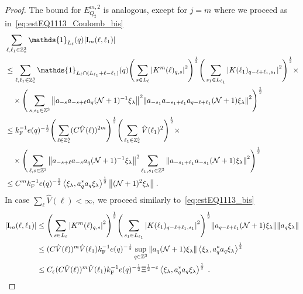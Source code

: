 \documentclass[12pt,a4paper]{article}
\numberwithin{equation}{section}
\newcommand{\1}{\mathbb{I}}
\newcommand{\F}{\mathrm{F}}
\newcommand{\I}{\mathrm{I}}
\newcommand{\Z}{\mathbb{Z}}
\newcommand{\NN}{\mathcal{N}}
\newcommand{\half}{\frac{1}{2}}
\newcommand{\eva}[1]{\left\langle #1 \right\rangle}
\theoremstyle{plain}
\theoremstyle{definition}
\theoremstyle{remark}
\theoremstyle{plain}
\theoremstyle{definition}
\theoremstyle{remark}
\begin{document}
\begin{proof}
The bound for $ E^{m,2}_{Q_2} $ is analogous, except for $ j = m $ where we proceed as in~\eqref{eq:estEQ1113_Coulomb_bis}
\begin{align}
	&\sum_{\ell,\ell_1 \in \Z^3_*} \mathds{1}_{L_\ell}(q) |\I_m(\ell, \ell_1)| \nonumber\\
	&\leq \sum_{\ell,\ell_1 \in \Z^3_*} \mathds{1}_{L_\ell \cap (L_{\ell_1}+\ell-\ell_1) }(q)
		\Bigg(\sum\limits_{s \in L_{\ell}} \abs{K^m(\ell)_{q,s}}^2\Bigg)^\half
		\Bigg(\sum\limits_{s_1 \in L_{\ell_1}} \abs{K(\ell_1)_{q-\ell+\ell_1,s_1}}^2\Bigg)^\half \times \nonumber\\
	&\quad \times \Bigg( \sum_{s,s_1 \in \Z^3} \norm{ a_{-s} a_{-s+\ell} a_q (\NN+1)^{-1} \xi_\lambda}^2
		\norm{ a_{-s_1} a_{-s_1+\ell_1} a_{q-\ell+\ell_1} (\NN+1) \xi_\lambda }^2 \Bigg)^{\half} \nonumber\\
	&\leq k_{\F}^{-1} e(q)^{-\frac 12}
		\Bigg(\sum_{\ell \in \Z^3_*} (C \hat{V}(\ell))^{2m} \Bigg)^\half
		\Bigg(\sum_{\ell_1 \in \Z^3_*} \hat{V}(\ell_1)^2 \Bigg)^\half \times \nonumber\\
	&\quad \times \Bigg( \sum_{\ell,s \in \Z^3} \norm{a_{-s+\ell} a_{-s} a_q (\NN+1)^{-1} \xi_\lambda}^2
		\sum_{\ell_1,s_1 \in \Z^3} \norm{a_{-s_1+\ell_1} a_{-s_1} (\NN+1) \xi_\lambda }^2 \Bigg)^{\half} \nonumber\\
	&\leq C^m k_{\F}^{-1} e(q)^{-\frac 12} \eva{\xi_\lambda, a_q^* a_q \xi_\lambda}^{\half} \norm{ (\NN+1)^2 \xi_\lambda } \;. \label{eq:estEQ2113_Coulomb_bis}
\end{align}
In case $ \sum_\ell \hat{V}(\ell) < \infty $, we proceed similarly to~\eqref{eq:estEQ1113_bis}
\begin{align}
	|\I_m(\ell, \ell_1)|
	&\leq \Bigg(\sum\limits_{s \in L_{\ell}} \abs{K^m(\ell)_{q,s}}^2\Bigg)^\half
		\Bigg(\sum\limits_{s_1 \in L_{\ell_1}} \abs{K(\ell_1)_{q-\ell+\ell_1,s_1}}^2\Bigg)^\half
		\norm{ a_{q-\ell+\ell_1} (\NN+1) \xi_\lambda}
		\norm{ a_q \xi_\lambda }\nonumber\\
	&\leq (C \hat{V}(\ell))^m \hat{V}(\ell_1) k_{\F}^{-1} e(q)^{-\half}
		\sup_{q \in \Z^3} \norm{ a_q (\NN+1) \xi_\lambda }
		\eva{\xi_\lambda, a_q^* a_q \xi_\lambda}^{\half} \nonumber\\
	&\leq C_\varepsilon (C \hat{V}(\ell))^m
		\hat{V}(\ell_1)
		k_{\F}^{-1} e(q)^{-\half} \Xi^{\half-\varepsilon} \eva{\xi_\lambda, a_q^* a_q \xi_\lambda}^{\half} \;. \label{eq:estEQ2113_bis}
\end{align}
\end{proof}
\end{document}
